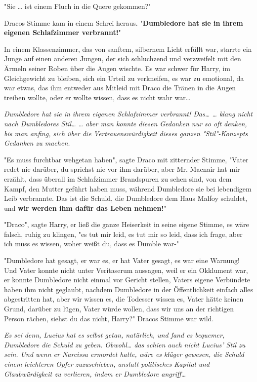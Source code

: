 {"Sie … ist einem Fluch in die Quere gekommen?"

Dracos Stimme kam in einem Schrei heraus. "\textbf{Dumbledore hat sie in ihrem eigenen Schlafzimmer verbrannt!}"

In einem Klassenzimmer, das von sanftem, silbernem Licht erfüllt war, starrte ein Junge auf einen anderen Jungen, der sich schluchzend und verzweifelt mit den Ärmeln seiner Roben über die Augen wischte. Es war schwer für Harry, im Gleichgewicht zu bleiben, sich ein Urteil zu verkneifen, es war zu emotional, da war etwas, das ihm entweder aus Mitleid mit Draco die Tränen in die Augen treiben wollte, oder er wollte wissen, dass es nicht wahr war…

\emph{Dumbledore hat sie in ihrem eigenen Schlafzimmer verbrannt! Das… … klang nicht nach Dumbledores Stil… … aber man konnte diesen Gedanken nur so oft denken, bis man anfing, sich über die Vertrauenswürdigkeit dieses ganzen "Stil"-Konzepts Gedanken zu machen.}

"Es muss furchtbar wehgetan haben", sagte Draco mit zitternder Stimme, "Vater redet nie darüber, du sprichst nie vor ihm darüber, aber Mr. Macnair hat mir erzählt, dass überall im Schlafzimmer Brandspuren zu sehen sind, von dem Kampf, den Mutter geführt haben muss, während Dumbledore sie bei lebendigem Leib verbrannte. Das ist die Schuld, die Dumbledore dem Haus Malfoy schuldet, und \textbf{wir werden ihm dafür das Leben nehmen!}"

"Draco", sagte Harry, er ließ die ganze Heiserkeit in seine eigene Stimme, es wäre falsch, ruhig zu klingen, "es tut mir leid, es tut mir so leid, dass ich frage, aber ich muss es wissen, woher weißt du, dass es Dumble war-"

"Dumbledore hat gesagt, er war es, er hat Vater gesagt, es war eine Warnung! Und Vater konnte nicht unter Veritaserum aussagen, weil er ein Okklument war, er konnte Dumbledore nicht einmal vor Gericht stellen, Vaters eigene Verbündete haben ihm nicht geglaubt, nachdem Dumbledore in der Öffentlichkeit einfach alles abgestritten hat, aber wir wissen es, die Todesser wissen es, Vater hätte keinen Grund, darüber zu lügen, Vater würde wollen, dass wir uns an der richtigen Person rächen, siehst du das nicht, Harry?" Dracos Stimme war wild.

\emph{Es sei denn, Lucius hat es selbst getan, natürlich, und fand es bequemer, Dumbledore die Schuld zu geben. Obwohl… das schien auch nicht Lucius' Stil zu sein. Und wenn er Narcissa ermordet hatte, wäre es klüger gewesen, die Schuld einem leichteren Opfer zuzuschieben, anstatt politisches Kapital und Glaubwürdigkeit zu verlieren, indem er Dumbledore angriff…}

}
